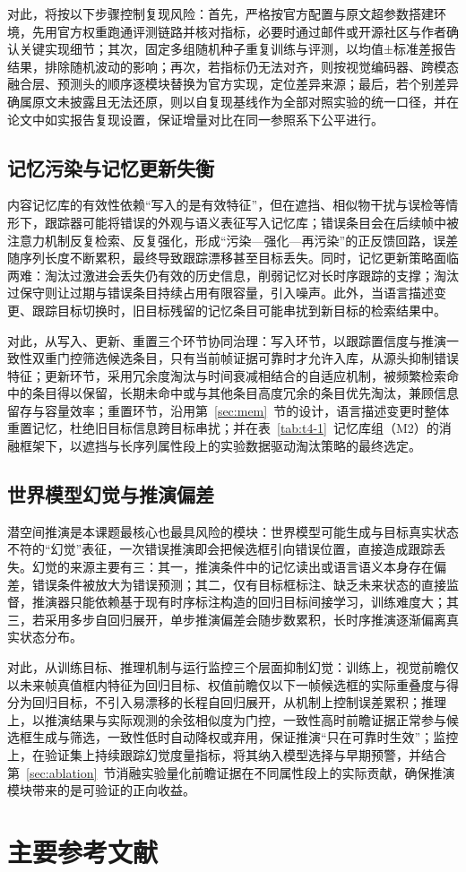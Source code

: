 对此，将按以下步骤控制复现风险：首先，严格按官方配置与原文超参数搭建环境，先用官方权重跑通评测链路并核对指标，必要时通过邮件或开源社区与作者确认关键实现细节；其次，固定多组随机种子重复训练与评测，以均值±标准差报告结果，排除随机波动的影响；再次，若指标仍无法对齐，则按视觉编码器、跨模态融合层、预测头的顺序逐模块替换为官方实现，定位差异来源；最后，若个别差异确属原文未披露且无法还原，则以自复现基线作为全部对照实验的统一口径，并在论文中如实报告复现设置，保证增量对比在同一参照系下公平进行。

\subsection{记忆污染与记忆更新失衡}

内容记忆库的有效性依赖“写入的是有效特征”，但在遮挡、相似物干扰与误检等情形下，跟踪器可能将错误的外观与语义表征写入记忆库；错误条目会在后续帧中被注意力机制反复检索、反复强化，形成“污染—强化—再污染”的正反馈回路，误差随序列长度不断累积，最终导致跟踪漂移甚至目标丢失。同时，记忆更新策略面临两难：淘汰过激进会丢失仍有效的历史信息，削弱记忆对长时序跟踪的支撑；淘汰过保守则让过期与错误条目持续占用有限容量，引入噪声。此外，当语言描述变更、跟踪目标切换时，旧目标残留的记忆条目可能串扰到新目标的检索结果中。

对此，从写入、更新、重置三个环节协同治理：写入环节，以跟踪置信度与推演一致性双重门控筛选候选条目，只有当前帧证据可靠时才允许入库，从源头抑制错误特征；更新环节，采用冗余度淘汰与时间衰减相结合的自适应机制，被频繁检索命中的条目得以保留，长期未命中或与其他条目高度冗余的条目优先淘汰，兼顾信息留存与容量效率；重置环节，沿用第~\ref{sec:mem}~节的设计，语言描述变更时整体重置记忆，杜绝旧目标信息跨目标串扰；并在表~\ref{tab:t4-1}~记忆库组（M2）的消融框架下，以遮挡与长序列属性段上的实验数据驱动淘汰策略的最终选定。

\subsection{世界模型幻觉与推演偏差}

潜空间推演是本课题最核心也最具风险的模块：世界模型可能生成与目标真实状态不符的“幻觉”表征，一次错误推演即会把候选框引向错误位置，直接造成跟踪丢失。幻觉的来源主要有三：其一，推演条件中的记忆读出或语言语义本身存在偏差，错误条件被放大为错误预测；其二，仅有目标框标注、缺乏未来状态的直接监督，推演器只能依赖基于现有时序标注构造的回归目标间接学习，训练难度大；其三，若采用多步自回归展开，单步推演偏差会随步数累积，长时序推演逐渐偏离真实状态分布。

对此，从训练目标、推理机制与运行监控三个层面抑制幻觉：训练上，视觉前瞻仅以未来帧真值框内特征为回归目标、权值前瞻仅以下一帧候选框的实际重叠度与得分为回归目标，不引入易漂移的长程自回归展开，从机制上控制误差累积；推理上，以推演结果与实际观测的余弦相似度为门控，一致性高时前瞻证据正常参与候选框生成与筛选，一致性低时自动降权或弃用，保证推演“只在可靠时生效”；监控上，在验证集上持续跟踪幻觉度量指标，将其纳入模型选择与早期预警，并结合第~\ref{sec:ablation}~节消融实验量化前瞻证据在不同属性段上的实际贡献，确保推演模块带来的是可验证的正向收益。

\section{主要参考文献}




